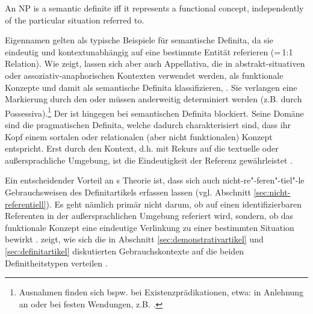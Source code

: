 \begin{exe}
	\ex \label{semdef}  An NP is a semantic definite iff it represents a functional concept, independently of the particular situation referred to. \parencite[299]{Lobner1985}
\end{exe}

Eigennamen  gelten als typische Beispiele für semantische  Definita, da sie eindeutig und kontextunabhängig auf eine bestimmte Entität referieren (=\,1:1 Relation). Wie \textcite[299--307]{Lobner1985} zeigt, lassen sich aber auch  Appellativa, die in abstrakt-situativen  oder assoziativ-anaphorischen  Kontexten verwendet werden, als funktionale Konzepte und damit als semantische Definita  klassifizieren, \parencite[s. hierzu auch ausführlich][104--110]{Demske2001}. Sie verlangen eine Markierung durch den  oder müssen anderweitig determiniert werden (z.B. durch Possessiva).\footnote{Ausnahmen finden sich bspw. bei Existenzprädikationen, etwa:  in Anlehnung an \textcite[297]{Lobner1985} oder bei festen Wendungen, z.B.  \parencite[311]{Lobner1985}.}
Der  ist hingegen bei semantischen Definita  blockiert. Seine Domäne sind die pragmatischen  Definita, welche dadurch charakterisiert sind, dass ihr Kopf einem sortalen oder relationalen (aber nicht funktionalen) Konzept entspricht. Erst durch den Kontext, d.h. mit Rekurs auf die textuelle oder außersprachliche Umgebung, ist die Eindeutigkeit der Referenz gewährleistet \parencite[307]{Lobner1985}. 

Ein entscheidender Vorteil an \citeauthor{Lobner1985}s Theorie ist, dass sich auch nicht-re"-feren"-tiel"-le Gebrauchsweisen des Definitartikels erfassen lassen (vgl. Abschnitt \ref{sec:nicht-referentiell}). Es geht nämlich primär nicht darum, ob auf einen  identifizierbaren Referenten in der außersprachlichen Umgebung referiert wird, sondern, ob das funktionale Konzept eine eindeutige Verlinkung zu einer bestimmten Situation bewirkt \parencite[304--307]{Lobner1985}. 
 zeigt, wie sich die in Abschnitt \ref{sec:demonstrativartikel} und \ref{sec:definitartikel} diskutierten Gebrauchskontexte auf die beiden Definitheitstypen verteilen \parencite[angelehnt an und erweitert nach][73]{Szczepaniak2011a}. 

